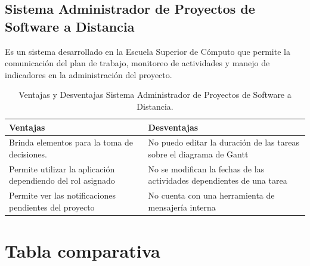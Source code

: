 \subsection{Sistema Administrador de Proyectos de Software a Distancia }  
Es un sistema desarrollado en la Escuela Superior de Cómputo que permite la comunicación del plan de trabajo, monitoreo de actividades y manejo de indicadores en la administración del proyecto. \cite{SistemaGestor}
\newline \newline
\begin{table}[htbp]
\begin{center}
\begin{tabular}{|p{85mm}|p{85mm}|}
\hline
Ventajas & Desventajas 
\\
\hline \hline
Brinda elementos para la toma de decisiones.  & No puedo editar la duración de las tareas sobre el diagrama de Gantt 

\\ \hline
Permite utilizar la aplicación dependiendo del rol asignado & No se modifican la fechas de las actividades dependientes de una tarea 

\\ \hline
Permite ver las notificaciones pendientes del proyecto & No cuenta con una herramienta de mensajería interna 

\\ \hline

\end{tabular}
\caption{Ventajas y Desventajas Sistema Administrador de Proyectos de Software a Distancia.}
\label{tabla:ventajas}
\end{center}
\end{table}

\section{Tabla comparativa}


